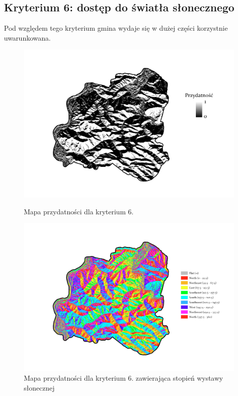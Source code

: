 \documentclass{article}
\begin{document}
\subsection{Kryterium 6: dostęp do światła słonecznego}
Pod względem tego kryterium gmina wydaje się w dużej części korzystnie uwarunkowana.

\begin{figure}[H]
    \begin{minipage}[t]{0.48\textwidth}
        \centering
        \includegraphics[width=\linewidth]{img/plesna-kryterium6-layout.jpg}
        \caption{Mapa przydatności dla kryterium 6.}
        \label{fig:kryterium6-layout}
    \end{minipage}
    \hfill
    \begin{minipage}[t]{0.48\textwidth}
        \centering
        \includegraphics[width=\linewidth]{img/plesna-kryterium6-aspect.jpg}
        \caption{Mapa przydatności dla kryterium 6. zawierająca stopień wystawy słonecznej}
        \label{fig:kryterium6-aspect}
    \end{minipage}
\end{figure}
\end{document}
